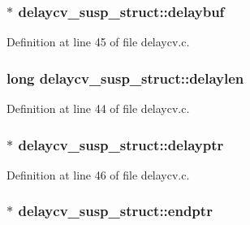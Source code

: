 \subsubsection[{\texorpdfstring{delaybuf}{delaybuf}}]{$\ast$ delaycv\+\_\+susp\+\_\+struct\+::delaybuf}\hypertarget{structdelaycv__susp__struct_a2da8c8f108ebcffbdaa3437c9e0801a0}{}\label{structdelaycv__susp__struct_a2da8c8f108ebcffbdaa3437c9e0801a0}


Definition at line 45 of file delaycv.\+c.

\subsubsection[{\texorpdfstring{delaylen}{delaylen}}]{\setlength{\rightskip}{0pt plus 5cm}long delaycv\+\_\+susp\+\_\+struct\+::delaylen}\hypertarget{structdelaycv__susp__struct_a088275d4d75aa777edf4146ecd0a80d9}{}\label{structdelaycv__susp__struct_a088275d4d75aa777edf4146ecd0a80d9}


Definition at line 44 of file delaycv.\+c.

\subsubsection[{\texorpdfstring{delayptr}{delayptr}}]{$\ast$ delaycv\+\_\+susp\+\_\+struct\+::delayptr}\hypertarget{structdelaycv__susp__struct_a5db63a760f9c9e7245a9bdf2835e73be}{}\label{structdelaycv__susp__struct_a5db63a760f9c9e7245a9bdf2835e73be}


Definition at line 46 of file delaycv.\+c.

\subsubsection[{\texorpdfstring{endptr}{endptr}}]{$\ast$ delaycv\+\_\+susp\+\_\+struct\+::endptr}\hypertarget{structdelaycv__susp__struct_a6811b5656751f531c2028c65ff18b07a}{}\label{structdelaycv__susp__struct_a6811b5656751f531c2028c65ff18b07a}


